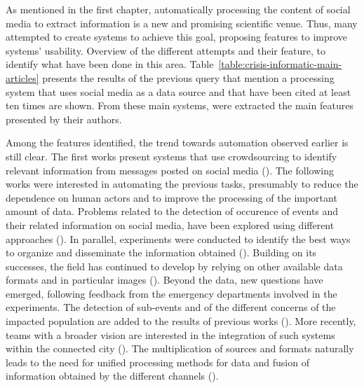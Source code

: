 As mentioned in the first chapter, automatically processing the content of social media to extract information is a new and promising scientific venue.
Thus, many attempted to create systems to achieve this goal, proposing features to improve systems' usability.
Overview of the different attempts and their feature, to identify what have been done in this area.
Table~\ref{table:crisis-informatic-main-articles} presents the results of the previous query that mention a processing system that uses social media as a data source and that have been cited at least ten times are shown.
From these main systems, were extracted the main features presented by their authors.

Among the features identified, the trend towards automation observed earlier is still clear.
The first works present systems that use crowdsourcing to identify relevant information from messages posted on social media
(\cite{schulzCrisisInformationManagement2012, backfriedOpenSourceIntelligence2012,imranAIDRArtificialIntelligence2014}).
The following works were interested in automating the previous tasks, presumably to reduce the dependence on human actors and to improve the processing of the important amount of data.
Problems related to the detection of occurence of events and their related information on social media, have been explored using different approaches (\cite{imranAIDRArtificialIntelligence2014,middletonRealtimeCrisisMapping2014,avvenutiEARSEarthquakeAlert2014, gibsonCombiningBigSocial2014}).
In parallel, experiments were conducted to identify the best ways to organize and disseminate the information obtained (\cite{middletonRealtimeCrisisMapping2014,huangDisasterMapperCyberGISFramework2015,avvenutiPullingInformationSocial2016,grunder-fahrerTopicsTopicalPhases2018}).
Building on its successes, the field has continued to develop by relying on other available data formats and in particular images (\cite{alamImage4ActOnlineSocial2017,nguyenAutomaticImageFiltering2017,agarwalCrisisDIASMultimodalDamage2020}).
Beyond the data, new questions have emerged, following feedback from the emergency departments involved in the experiments.
The detection of sub-events and of the different concerns of the impacted population are added to the results of previous works (\cite{wuStreamExplorerMultiStageSystem2018,raginiBigDataAnalytics2018,grunder-fahrerTopicsTopicalPhases2018}).
More recently, teams with a broader vision are interested in the integration of such systems within the connected city (\cite{shahDisasterResilientSmart2019}).
The multiplication of sources and formats naturally leads to the need for unified processing methods for data and fusion of information obtained by the different channels (\cite{alamDescriptiveVisualSummaries2020}).

